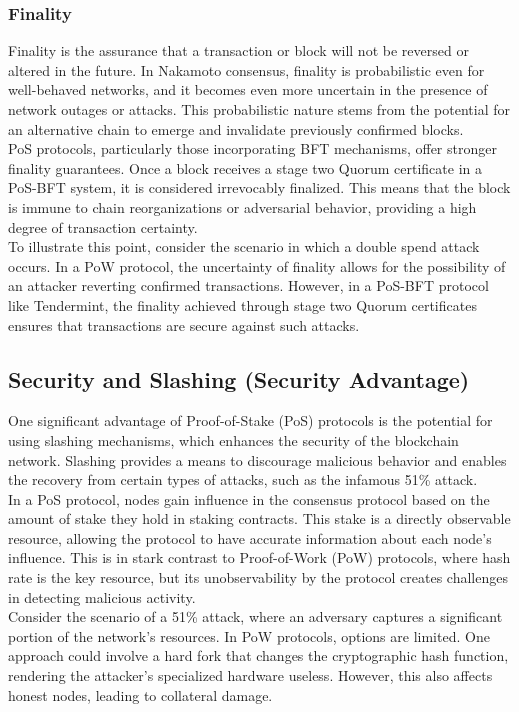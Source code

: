 \subsubsection{Finality}
Finality is the assurance that a transaction or block will not be reversed or altered in the future. In Nakamoto consensus, finality is probabilistic even for well-behaved networks, and it becomes even more uncertain in the presence of network outages or attacks. This probabilistic nature stems from the potential for an alternative chain to emerge and invalidate previously confirmed blocks.\\
PoS protocols, particularly those incorporating BFT mechanisms, offer stronger finality guarantees. Once a block receives a stage two Quorum certificate in a PoS-BFT system, it is considered irrevocably finalized. This means that the block is immune to chain reorganizations or adversarial behavior, providing a high degree of transaction certainty.\\
To illustrate this point, consider the scenario in which a double spend attack occurs. In a PoW protocol, the uncertainty of finality allows for the possibility of an attacker reverting confirmed transactions. However, in a PoS-BFT protocol like Tendermint, the finality achieved through stage two Quorum certificates ensures that transactions are secure against such attacks.

\subsection{Security and Slashing (Security Advantage)}
One significant advantage of Proof-of-Stake (PoS) protocols is the potential for using slashing mechanisms, which enhances the security of the blockchain network. Slashing provides a means to discourage malicious behavior and enables the recovery from certain types of attacks, such as the infamous 51\% attack.\\
In a PoS protocol, nodes gain influence in the consensus protocol based on the amount of stake they hold in staking contracts. This stake is a directly observable resource, allowing the protocol to have accurate information about each node's influence. This is in stark contrast to Proof-of-Work (PoW) protocols, where hash rate is the key resource, but its unobservability by the protocol creates challenges in detecting malicious activity.\\

Consider the scenario of a 51\% attack, where an adversary captures a significant portion of the network's resources. In PoW protocols, options are limited. One approach could involve a hard fork that changes the cryptographic hash function, rendering the attacker's specialized hardware useless. However, this also affects honest nodes, leading to collateral damage.\\

